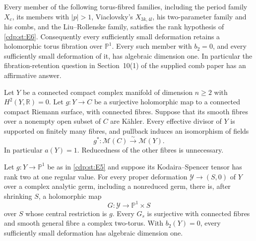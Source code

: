 
\begin{proposition}\hypertarget{tag-01GW}{}\label{cdp:st:E7}


Every member of the following torus-fibred families,
including the period family $X_c$, its members with $|p|>1$,
Viaclovsky's $X_{3k,4l}$, his two-parameter family and his combs,
and the Liu--Rollenske family, satisfies the rank hypothesis of \ref{cdp:st:E6}.
Consequently every sufficiently small deformation retains a
holomorphic torus fibration over $\mathbb P^1$. Every such member
with $b_2=0$, and every sufficiently small deformation of it, has
algebraic dimension one. In particular the fibration-retention
question in Section~10(1) of the supplied comb paper has an
affirmative answer.
\end{proposition}

\begin{proposition}\hypertarget{tag-01GG}{}\label{cdp:st:E1}


Let $Y$ be a connected compact complex manifold of dimension $n\geq2$
with $H^2(Y,\mathbb R)=0$. Let $g:Y\to C$ be a surjective holomorphic
map to a connected compact Riemann surface, with connected fibres.
Suppose that its smooth fibres over a nonempty open subset of $C$ are
K\"ahler. Every effective divisor of $Y$ is supported on finitely many
fibres, and pullback induces an isomorphism of fields
\[
 g^*: \mathcal M(C)\xrightarrow{\ \sim\ }\mathcal M(Y).
\]
In particular $a(Y)=1$. Reducedness of the other fibres is unnecessary.
\end{proposition}

\begin{proposition}\hypertarget{tag-01GV}{}\label{cdp:st:E6}


Let $g:Y\to\mathbb P^1$ be as in \ref{cdp:st:E5} and suppose its
Kodaira--Spencer tensor has rank two at one regular value. For every
proper deformation $\mathcal Y\to(S,0)$ of $Y$ over a complex
analytic germ, including a nonreduced germ, there is, after shrinking
$S$, a holomorphic map
\[
 G:\mathcal Y\longrightarrow\mathbb P^1\times S
\]
over $S$ whose central restriction is $g$. Every $G_s$ is surjective
with connected fibres and smooth general fibre a complex two-torus.
With $b_2(Y)=0$, every sufficiently small deformation has algebraic
dimension one.
\end{proposition}

